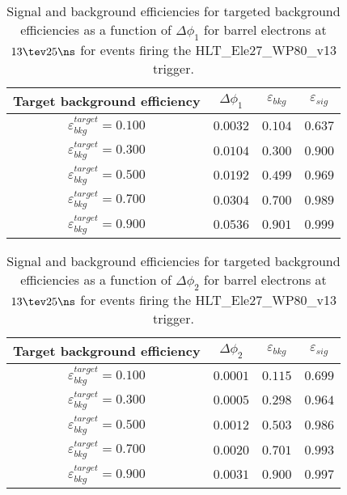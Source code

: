 \clearpage

\begin{table}[!bht]
  \begin{center}
    \begin{tabular}{cccc}
      \hline
      Target background efficiency & $\Delta\phi_1$ & $\varepsilon_{bkg}$ & $\varepsilon_{sig}$ \\ 
      \hline
      $\varepsilon_{bkg}^{target} = 0.100$ & $  0.0032$ & $0.104$ & $0.637$ \\
      $\varepsilon_{bkg}^{target} = 0.300$ & $  0.0104$ & $0.300$ & $0.900$ \\
      $\varepsilon_{bkg}^{target} = 0.500$ & $  0.0192$ & $0.499$ & $0.969$ \\
      $\varepsilon_{bkg}^{target} = 0.700$ & $  0.0304$ & $0.700$ & $0.989$ \\
      $\varepsilon_{bkg}^{target} = 0.900$ & $  0.0536$ & $0.901$ & $0.999$ \\
      \hline
    \end{tabular}
    \caption{Signal and background efficiencies for targeted background efficiencies as a function of $\Delta\phi_1$ for barrel electrons at $13\tev 25\ns$ for events firing the HLT\_Ele27\_WP80\_v13 trigger.}
    \label{tab:eff_rej_phi1_beam_13_25_trigger_27_B}
  \end{center}
\end{table}

\clearpage

\begin{table}[!bht]
  \begin{center}
    \begin{tabular}{cccc}
      \hline
      Target background efficiency & $\Delta\phi_2$ & $\varepsilon_{bkg}$ & $\varepsilon_{sig}$ \\ 
      \hline
      $\varepsilon_{bkg}^{target} = 0.100$ & $  0.0001$ & $0.115$ & $0.699$ \\
      $\varepsilon_{bkg}^{target} = 0.300$ & $  0.0005$ & $0.298$ & $0.964$ \\
      $\varepsilon_{bkg}^{target} = 0.500$ & $  0.0012$ & $0.503$ & $0.986$ \\
      $\varepsilon_{bkg}^{target} = 0.700$ & $  0.0020$ & $0.701$ & $0.993$ \\
      $\varepsilon_{bkg}^{target} = 0.900$ & $  0.0031$ & $0.900$ & $0.997$ \\
      \hline
    \end{tabular}
    \caption{Signal and background efficiencies for targeted background efficiencies as a function of $\Delta\phi_2$ for barrel electrons at $13\tev 25\ns$ for events firing the HLT\_Ele27\_WP80\_v13 trigger.}
    \label{tab:eff_rej_phi2_beam_13_25_trigger_27_B}
  \end{center}
\end{table}

